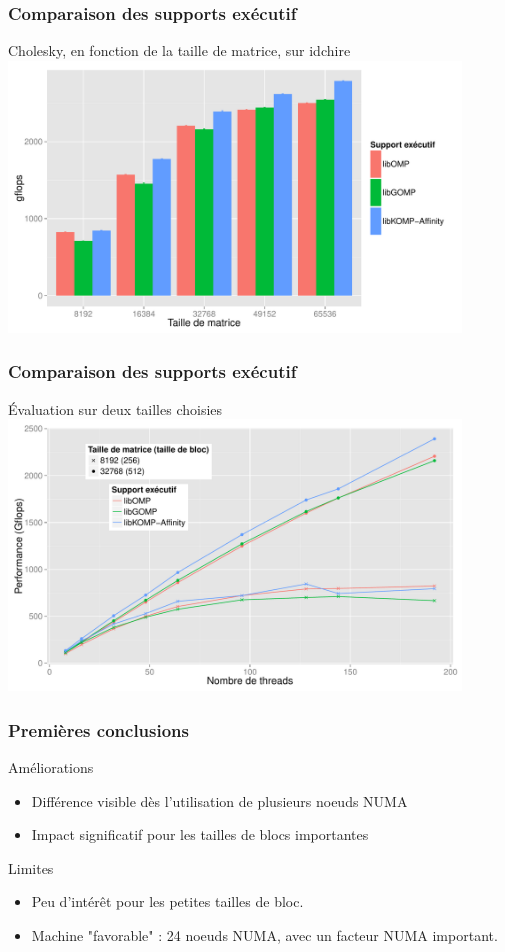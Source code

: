 \documentclass[xcolor={usenames,dvipsnames,svgnames,table}, aspectratio=43]{beamer}
\begin{document}
\begin{frame}
  \frametitle{Comparaison des supports exécutif}
  Cholesky, en fonction de la taille de matrice, sur idchire
  \includegraphics[width=0.9\textwidth]{graph/graph_details_cholesky_idchire.pdf}
\end{frame}

\begin{frame}
  \frametitle{Comparaison des supports exécutif}
  Évaluation sur deux tailles choisies
  \includegraphics[width=0.9\textwidth]{graph/graph_all_cholesky_idchire.pdf}
\end{frame}

\begin{frame}
  \frametitle{Premières conclusions}
  \begin{exampleblock}{Améliorations}
    \begin{itemize}
      \item Différence visible dès l'utilisation de plusieurs noeuds NUMA
      \item Impact significatif pour les tailles de blocs importantes
    \end{itemize}
  \end{exampleblock}

  \begin{alertblock}{Limites}
    \begin{itemize}
      \item Peu d'intérêt pour les petites tailles de bloc.
      \item Machine "favorable" : 24 noeuds NUMA, avec un facteur NUMA important.
    \end{itemize}
  \end{alertblock}
\end{frame}
\end{document}
